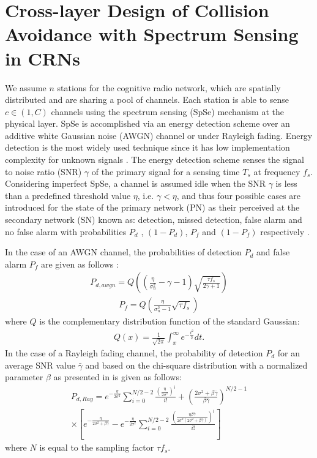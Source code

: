 \documentclass
[journal,11pt,draftclsnofoot,onecolumn,doublespace]{tETN2e}
\begin{document}
\section{Cross-layer Design of Collision Avoidance with Spectrum Sensing in CRNs}

We assume $n$ stations for the cognitive radio network, which are spatially distributed and are sharing a pool of channels. Each station is able to sense $c\in(1,C)$ channels using the spectrum sensing (SpSe) mechanism at the physical layer. SpSe is accomplished via an energy detection scheme over an additive white Gaussian noise (AWGN) channel or under Rayleigh fading. Energy detection is the most widely used technique since it has low implementation complexity for unknown signals \citep{yucek09}. The energy detection scheme senses the signal to noise ratio (SNR) $\gamma$ of the primary signal for a sensing time $T_s$ at frequency $f_s$. Considering imperfect SpSe, a channel is assumed idle when the SNR $\gamma$ is less than a predefined threshold value $\eta$, i.e. $\gamma < \eta$, and thus four possible cases are introduced for the state of the primary network (PN) as their perceived at the secondary network (SN) known as: detection, missed detection, false alarm and no false alarm with probabilities $P_d$ , $(1-P_d)$, $P_f$ and $(1-P_f)$ respectively \citep{liang08}. 

In the case of an AWGN channel, the probabilities of detection $P_d$ and false alarm $P_f$ are given as follows \citep{liang08}: 
\begin{eqnarray} \label{eq1}
P_{d,awgn} = Q\left(\left(\frac{\eta}{\sigma_{n}^2}-\gamma -1\right) \sqrt{\frac{\tau f_s}{2\gamma +1}} \right)  
\end{eqnarray}
\begin{eqnarray} \label{eq2}
P_f = Q \left( \frac{\eta}{\sigma_n^2 -1} \sqrt{\tau f_s} \right) 
\end{eqnarray}
where $Q$ is the complementary distribution function of the standard Gaussian:\begin{eqnarray} \label{eq3}
Q(x) = \frac{1}{\sqrt{2 \pi}} \int_x^{\infty} e^{-\frac{t^2}{2}} dt . 
\end{eqnarray} 
In the case of a Rayleigh fading channel, the probability of detection $P_d$ for an average SNR value $\bar{\gamma}$ and based on the chi-square distribution with a normalized parameter $\beta$ as presented in \citep{digham07} is given as follows: 
\begin{eqnarray} \label{eq4}
P_{d,Ray} = e^{-\frac{\eta}{2\sigma^2}} \sum_{i=0}^{N/2-2} \frac{\left(\frac{\eta}{2\sigma^2}\right)^i}{i!} + \left(\frac{2\sigma^2 + \beta \bar{\gamma}}{\beta \bar{\gamma}} \right)^{N/2-1} \nonumber \\
\times \left[ e^{-\frac{\eta}{2\sigma^2 +\beta \bar{\gamma}}} - e^{-\frac{\eta}{2\sigma^2}} \sum_{i=0}^{N/2-2} \frac{\left(\frac{\eta \beta \bar{\gamma}}{2\sigma^2(2\sigma^2 + \beta \bar{\gamma}
)} \right)^i}{i!} \right]
\end{eqnarray} 
where $N$ is equal to the sampling factor $\tau f_s$. 
\end{document}
